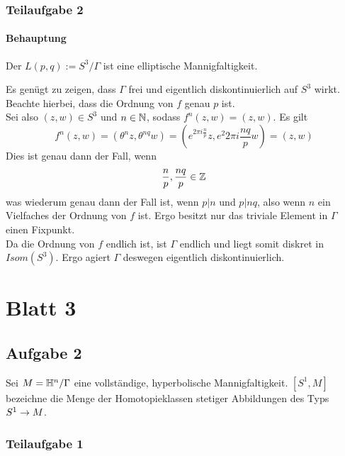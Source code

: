 \documentclass{book}
\begin{document}
\subsubsection{Teilaufgabe 2}
\paragraph{Behauptung} Der 
$L(p,q) := S^3 / \Gamma$
ist eine elliptische Mannigfaltigkeit.

\begin{Beweis}{}
	Es genügt zu zeigen, dass $\Gamma$ frei und eigentlich diskontinuierlich auf $S^3$ wirkt. Beachte hierbei, dass die Ordnung von $f$ genau $p$ ist.\\
	Sei also $(z,w) \in S^3$ und $n \in \mathbb{N}$, sodass $f^n(z,w) = (z,w)$. Es gilt
	\[ f^n(z,w) = (\theta^nz, \theta^{nq}w) = (e^{2\pi i\frac{n}{p}}z, e^2{2\pi i \frac{nq}{p}}w) = (z,w) \]
	Dies ist genau dann der Fall, wenn
	\[ \frac{n}{p}, \frac{nq}{p} \in \mathbb{Z} \]
	was wiederum genau dann der Fall ist, wenn $p|n$ und $p|nq$, also wenn $n$ ein Vielfaches der Ordnung von $f$ ist. Ergo besitzt nur das triviale Element in $\Gamma$ einen Fixpunkt.\\
	Da die Ordnung von $f$ endlich ist, ist $\Gamma$ endlich und liegt somit diskret in $Isom(S^3)$. Ergo agiert $\Gamma$ deswegen eigentlich diskontinuierlich.
\end{Beweis}

\newpage
\section{Blatt 3}
\subsection{Aufgabe 2}
Sei $M = \mathbb{H}^n / \Gamma$ eine vollständige, hyperbolische Mannigfaltigkeit. $[S^1, M]$ bezeichne die Menge der Homotopieklassen stetiger Abbildungen des Typs $S^1 \overset{}{\rightarrow} M$.
\subsubsection{Teilaufgabe 1}
\end{document}
